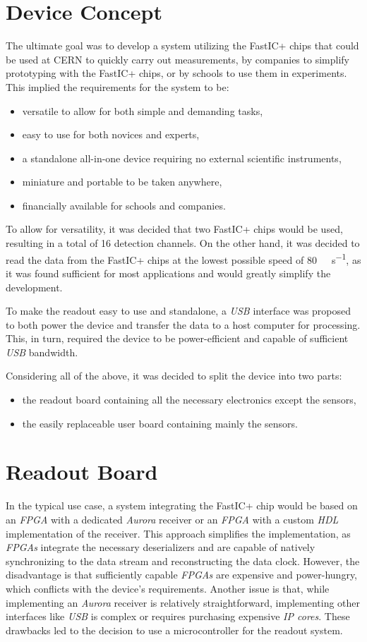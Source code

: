 \chapter{Device Concept}
The ultimate goal was to develop a system utilizing the FastIC+ chips that could be used at CERN to quickly carry out measurements, by companies to simplify prototyping with the FastIC+ chips, or by schools to use them in experiments. This implied the requirements for the system to be:
\begin{itemize}
    \item versatile to allow for both simple and demanding tasks,
    \item easy to use for both novices and experts,
    \item a standalone all-in-one device requiring no external scientific instruments,
    \item miniature and portable to be taken anywhere,
    \item financially available for schools and companies.
\end{itemize}

To allow for versatility, it was decided that two FastIC+ chips would be used, resulting in a total of 16 detection channels. On the other hand, it was decided to read the data from the FastIC+ chips at the lowest possible speed of \SI{80}{\mega\bit\per\second}, as it was found sufficient for most applications and would greatly simplify the development.

To make the readout easy to use and standalone, a \emph{USB} interface was proposed to both power the device and transfer the data to a host computer for processing. This, in turn, required the device to be power-efficient and capable of sufficient \emph{USB} bandwidth.

Considering all of the above, it was decided to split the device into two parts: 
\begin{itemize}
    \item the readout board containing all the necessary electronics except the sensors,
    \item the easily replaceable user board containing mainly the sensors.
\end{itemize}

\chapter{Readout Board}
In the typical use case, a system integrating the FastIC+ chip would be based on an \emph{FPGA} with a dedicated \emph{Aurora} receiver or an \emph{FPGA} with a custom \emph{HDL} implementation of the receiver. This approach simplifies the implementation, as \emph{FPGAs} integrate the necessary deserializers and are capable of natively synchronizing to the data stream and reconstructing the data clock. However, the disadvantage is that sufficiently capable \emph{FPGAs} are expensive and power-hungry, which conflicts with the device's requirements. Another issue is that, while implementing an \emph{Aurora} receiver is relatively straightforward, implementing other interfaces like \emph{USB} is complex or requires purchasing expensive \emph{IP cores}. These drawbacks led to the decision to use a microcontroller for the readout system.

